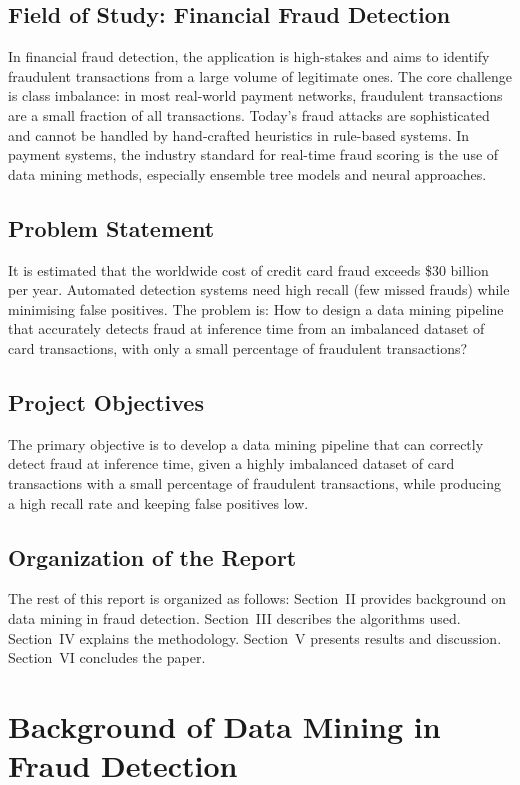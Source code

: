 \documentclass[conference]{IEEEtran}
\begin{document}
\subsection{Field of Study: Financial Fraud Detection}
In financial fraud detection, the application is high-stakes and aims to identify fraudulent transactions from a large volume of legitimate ones. The core challenge is class imbalance: in most real-world payment networks, fraudulent transactions are a small fraction of all transactions. Today's fraud attacks are sophisticated and cannot be handled by hand-crafted heuristics in rule-based systems. In payment systems, the industry standard for real-time fraud scoring is the use of data mining methods, especially ensemble tree models and neural approaches.

\subsection{Problem Statement}
It is estimated that the worldwide cost of credit card fraud exceeds \$30 billion per year. Automated detection systems need high recall (few missed frauds) while minimising false positives. The problem is: How to design a data mining pipeline that accurately detects fraud at inference time from an imbalanced dataset of card transactions, with only a small percentage of fraudulent transactions?

\subsection{Project Objectives}
The primary objective is to develop a data mining pipeline that can correctly detect fraud at inference time, given a highly imbalanced dataset of card transactions with a small percentage of fraudulent transactions, while producing a high recall rate and keeping false positives low.

\subsection{Organization of the Report}
The rest of this report is organized as follows: Section~II provides background on data mining in fraud detection. Section~III describes the algorithms used. Section~IV explains the methodology. Section~V presents results and discussion. Section~VI concludes the paper.

\section{Background of Data Mining in Fraud Detection}
\end{document}
